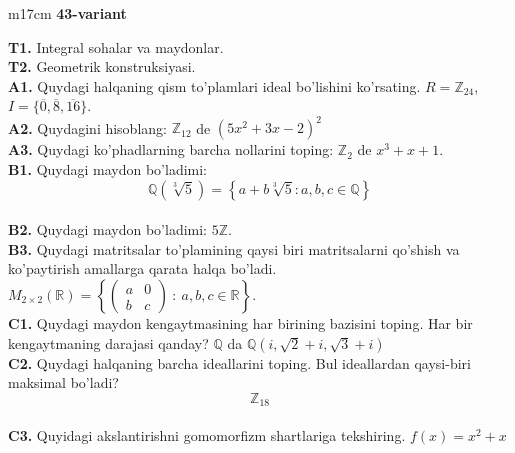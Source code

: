 \documentclass{article}
\begin{document}
\begin{tabular}{m{17cm}}
\textbf{43-variant}
\newline

\textbf{T1.} Integral sohalar va maydonlar. \\
\textbf{T2.} Geometrik konstruksiyasi. \\
\textbf{A1.} Quydagi halqaning qism to'plamlari ideal bo'lishini ko'rsating.
\(R = \mathbb{Z}_{24}\), \(I = \{\overline{0},\overline{8},\overline{16}\}\). \\
\textbf{A2.} Quydagini hisoblang:
\(\mathbb{Z}_{12}\) de \(\left( 5x^{2} + 3x - 2 \right)^{2}\) \\
\textbf{A3.} Quydagi ko'phadlarning barcha nollarini toping:
\(\mathbb{Z}_{2}\) de \(x^{3} + x + 1\). \\
\textbf{B1.} Quydagi maydon bo'ladimi:
\[\mathbb{Q}\left( \sqrt[3]{5} \right) = \left\{ a + b\sqrt[3]{5}:a,b,c \in \mathbb{Q} \right\}\] \\
\textbf{B2.} Quydagi maydon bo'ladimi:
\(5\mathbb{Z}\). \\
\textbf{B3.} Quydagi matritsalar to'plamining qaysi biri matritsalarni qo'shish va ko'paytirish amallarga qarata halqa bo'ladi.
\(M_{2 \times 2}\mathbb{(R) =}\left\{ \begin{pmatrix}
a & 0 \\
b & c
\end{pmatrix}\ :\ a,b,c \in \mathbb{R} \right\}\). \\
\textbf{C1.} Quydagi maydon kengaytmasining har birining bazisini toping. Har bir kengaytmaning darajasi qanday?
\(\mathbb{Q}\) da \(\mathbb{Q}\left( i,\sqrt{2} + i,\sqrt{3} + i \right)\) \\
\textbf{C2.} Quydagi halqaning barcha ideallarini toping. Bul ideallardan qaysi-biri maksimal bo'ladi?
\[\mathbb{Z}_{18}\] \\
\textbf{C3.} Quyidagi akslantirishni gomomorfizm shartlariga tekshiring. \(f(x) = x^{2} + x\) \\

\end{tabular}
\vspace{1cm}
\end{document}
